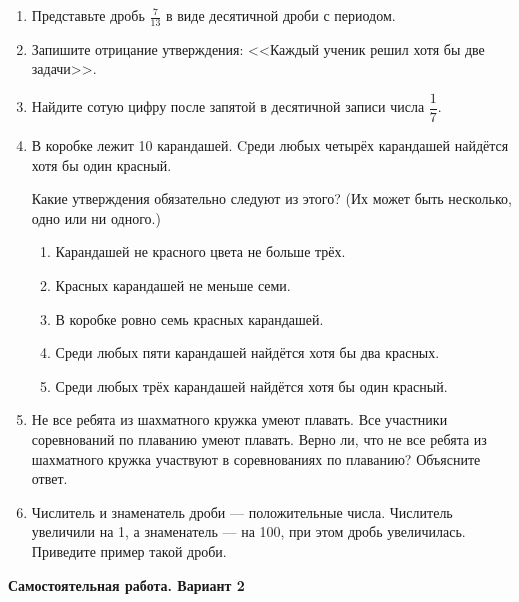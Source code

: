 \begin{enumerate}[itemsep=0.8em]
    \item Представьте дробь $\frac{7}{13}$ в виде десятичной дроби с периодом.

    \item Запишите отрицание утверждения: <<Каждый ученик решил хотя бы две задачи>>.

    \vspace{1.5cm}

    \item Найдите сотую цифру после запятой в десятичной записи числа $\dfrac{1}{7}$.

    \item В коробке лежит 10 карандашей. Cреди любых четырёх карандашей найдётся хотя бы один красный.

    Какие утверждения обязательно следуют из этого? (Их может быть несколько, одно или ни одного.)

    \begin{enumerate}[label={},leftmargin=1.7em,itemsep=0.4em]
        \item[а)] Карандашей не красного цвета не больше трёх.
        \item[б)] Красных карандашей не меньше семи.
        \item[в)] В коробке ровно семь красных карандашей.
        \item[г)] Среди любых пяти карандашей найдётся хотя бы два красных.
        \item[д)] Среди любых трёх карандашей найдётся хотя бы один красный.
    \end{enumerate}

    \newpage

    \item Не все ребята из шахматного кружка умеют плавать. Все участники соревнований по плаванию умеют плавать. Верно ли, что не все ребята из шахматного кружка участвуют в соревнованиях по плаванию? Объясните ответ.

    \vspace{5cm}

    \item  Числитель и знаменатель дроби — положительные числа. Числитель увеличили на 1, а знаменатель — на 100, при этом дробь увеличилась. Приведите пример такой дроби.
\end{enumerate}

\newpage

\begin{center}
    \large\textbf{Самостоятельная работа. Вариант 2}
\end{center}

